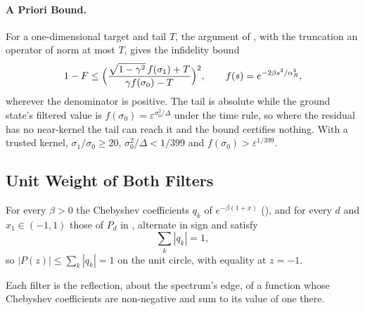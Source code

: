 \paragraph{A Priori Bound.} For a one-dimensional target and tail $T$, the argument of , with the truncation an operator of norm at most $T$, gives the infidelity bound
\begin{equation*}
    1-F\le\Bigl(\frac{\sqrt{1-\gamma^2}\,f(\sigma_1)+T}{\gamma f(\sigma_0)-T}\Bigr)^2,
    \qquad f(s)=e^{-2\beta s^2/\alpha_R^2},
\end{equation*}
wherever the denominator is positive. The tail is absolute while the ground state's filtered value is $f(\sigma_0)=\varepsilon^{\sigma_0^2/\Delta}$ under the time rule, so where the residual has no near-kernel the tail can reach it and the bound certifies nothing. With a trusted kernel, $\sigma_1/\sigma_0\ge20$, $\sigma_0^2/\Delta<1/399$ and $f(\sigma_0)>\varepsilon^{1/399}$.

\subsection{Unit Weight of Both Filters}
\label{app:proof-filter-normalisation}

\begin{proposition}
\label{prop:filter-normalisation}
For every $\beta>0$ the Chebyshev coefficients $q_k$ of $e^{-\beta(1+x)}$ (), and for every $d$ and $x_1\in(-1,1)$ those of $P_d$ in , alternate in sign and satisfy
\begin{equation}
    \sum_{k}|q_k|=1 ,
    \label{eq:filter-normalisation}
\end{equation}
so $|P(z)|\le\sum_k|q_k|=1$ on the unit circle, with equality at $z=-1$.
\end{proposition}

Each filter is the reflection, about the spectrum's edge, of a function whose Chebyshev coefficients are non-negative and sum to its value of one there.

